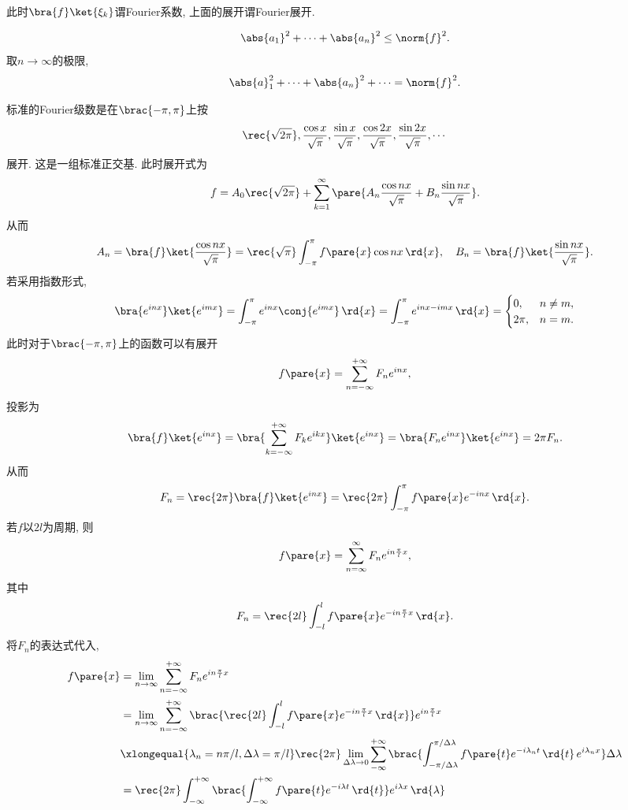 \documentclass[../ComplexVariable.tex]{subfiles}
\begin{document}
此时$\bra{f}\ket{\xi_k}$谓Fourier系数, 上面的展开谓Fourier展开.
\begin{theorem}
    \[ \abs{a_1}^2 + \cdots + \abs{a_n}^2 \le \norm{f}^2. \]
    取$n\rightarrow \infty$的极限,
    \[ \abs{a}_1^2 + \cdots + \abs{a_n}^2 + \cdots = \norm{f}^2. \]
\end{theorem}
标准的Fourier级数是在$\brac{-\pi,\pi}$上按
\[ \rec{\sqrt{2\pi}}, \frac{\cos x}{\sqrt{\pi}}, \frac{\sin x}{\sqrt{\pi}}, \frac{\cos 2x}{\sqrt{\pi}}, \frac{\sin 2x}{\sqrt{\pi}}, \cdots \]
展开. 这是一组标准正交基. 此时展开式为
\[ f = A_0\rec{\sqrt{2\pi}} + \sum_{k=1}^\infty \pare{A_n \frac{\cos nx}{\sqrt{\pi}} + B_n \frac{\sin nx}{\sqrt{\pi}}}. \]
从而
\[ A_n = \bra{f}\ket{\frac{\cos nx}{\sqrt{\pi}}} = \rec{\sqrt{\pi}}\int_{-\pi}^{\pi} f\pare{x} \cos nx\,\rd{x},\quad B_n = \bra{f}\ket{\frac{\sin nx}{\sqrt{\pi}}}. \]
若采用指数形式,
\[ \bra{e^{inx}}\ket{e^{imx}} = \int_{-\pi}^\pi e^{inx}\conj{e^{imx}}\,\rd{x} = \int_{-\pi}^{\pi} e^{inx - imx}\,\rd{x} = \begin{cases}
    0, & n\neq m, \\
    2\pi, & n=m.
\end{cases} \]
此时对于$\brac{-\pi,\pi}$上的函数可以有展开
\[ f\pare{x} = \sum_{n=-\infty}^{+\infty} F_ne^{inx}, \]
投影为
\[ \bra{f}\ket{e^{inx}} = \bra{\sum_{k=-\infty}^{+\infty} F_ke^{ikx}}\ket{e^{inx}} = \bra{F_ne^{inx}}\ket{e^{inx}} = 2\pi F_n. \]
从而
\[ F_n = \rec{2\pi}\bra{f}\ket{e^{inx}} = \rec{2\pi} \int_{-\pi}^\pi f\pare{x}e^{-inx}\,\rd{x}. \]
若$f$以$2l$为周期, 则
\[ f\pare{x} = \sum_{n=\infty}^{\infty} F_n e^{in\frac{\pi}{l}x}, \]
其中
\[ F_n = \rec{2l}\int_{-l}^l f\pare{x} e^{-in\frac{\pi}{l}x}\,\rd{x}. \]
将$F_n$的表达式代入,
\begin{align*}
    f\pare{x} &= \lim_{n\rightarrow\infty} \sum_{n=-\infty}^{+\infty} F_n e^{in\frac{\pi}{l}x} \\
    &= \lim_{n\rightarrow\infty} \sum_{n=-\infty}^{+\infty} \brac{\rec{2l}\int_{-l}^l f\pare{x} e^{-in\frac{\pi}{l}x}\,\rd{x}} e^{in\frac{\pi}{l}x} \\
    &\xlongequal{\lambda_n = {n\pi}/{l},\Delta\lambda = \pi/l} \rec{2\pi} \lim_{\Delta\lambda\rightarrow 0}\sum_{-\infty}^{+\infty} \brac{\int_{-\pi/\Delta\lambda}^{\pi/\Delta\lambda} f\pare{t}e^{-i\lambda_n t}\,\rd{t}\, e^{i\lambda_n x}}\Delta\lambda \\
    &= \rec{2\pi} \int_{-\infty}^{+\infty} \brac{\int_{-\infty}^{+\infty} f\pare{t} e^{-i\lambda t}\,\rd{t}}e^{i\lambda x}\,\rd{\lambda}
\end{align*}
\end{document}
